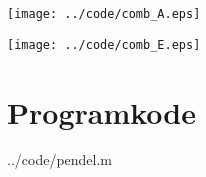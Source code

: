 \texttt{[image: ../code/comb\_A.eps]}

\vfill

\texttt{[image: ../code/comb\_E.eps]}


\clearpage
\section{Programkode} %
\label{sec:programkode}

  {../code/pendel.m}

